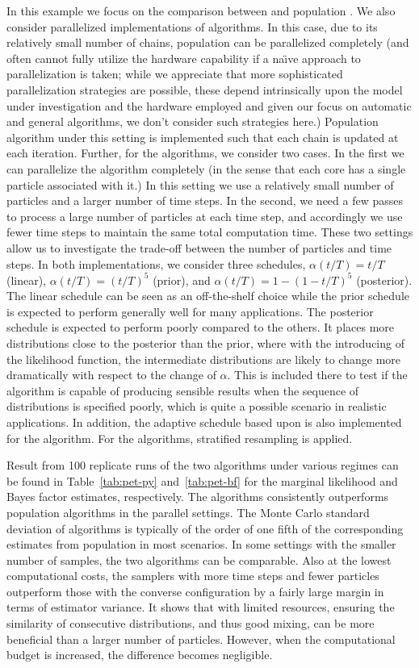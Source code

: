 In this example we focus on the comparison between \smc[2] and population
\mcmc. We also consider parallelized implementations of algorithms. In this
case, due to its relatively small number of chains, population \mcmc can be
parallelized completely (and often cannot fully utilize the hardware
capability if a na\"\i ve approach to parallelization is taken; while we
appreciate that more sophisticated parallelization strategies are possible,
these depend intrinsically upon the model under investigation and the
hardware employed and given our focus on automatic and general algorithms, we
don't consider such strategies here.) Population \mcmc algorithm under this
setting is implemented such that each chain is updated at each iteration.
Further, for the \smc algorithms, we consider two cases. In the first we can
parallelize the algorithm completely (in the sense that each core has a
single particle associated with it.) In this setting we use a relatively
small number of particles and a larger number of time steps. In the second,
we need a few passes to process a large number of particles at each time
step, and accordingly we use fewer time steps to maintain the same total
computation time. These two settings allow us to investigate the trade-off
between the number of particles and time steps. In both implementations, we
consider three schedules, $\alpha(t/T) = t/T$ (linear), $\alpha(t/T) =
(t/T)^5$ (prior), and $\alpha(t/T) = 1 - (1 - t/T)^5$ (posterior). The linear
schedule can be seen as an off-the-shelf choice while the prior schedule is
expected to perform generally well for many applications. The posterior
schedule is expected to perform poorly compared to the others. It places more
distributions close to the posterior than the prior, where with the
introducing of the likelihood function, the intermediate distributions are
likely to change more dramatically with respect to the change of $\alpha$.
This is included there to test if the algorithm is capable of producing
sensible results when the sequence of distributions is specified poorly,
which is quite a possible scenario in realistic applications. In addition,
the adaptive schedule based upon \cess is also implemented for the \smc[2]
algorithm. For the \smc algorithms, stratified resampling is applied.

Result from 100 replicate runs of the two algorithms under various regimes
can be found in Table~\ref{tab:pet-py} and~\ref{tab:pet-bf} for the marginal
likelihood and Bayes factor estimates, respectively. The \smc algorithms
consistently outperforms population \mcmc algorithms in the parallel
settings. The Monte Carlo standard deviation of \smc algorithms is typically
of the order of one fifth of the corresponding estimates from population
\mcmc in most scenarios. In some settings with the smaller number of samples,
the two algorithms can be comparable. Also at the lowest computational costs,
the samplers with more time steps and fewer particles outperform those with
the converse configuration by a fairly large margin in terms of estimator
variance. It shows that with limited resources, ensuring the similarity of
consecutive distributions, and thus good mixing, can be more beneficial than
a larger number of particles. However, when the computational budget is
increased, the difference becomes negligible.

